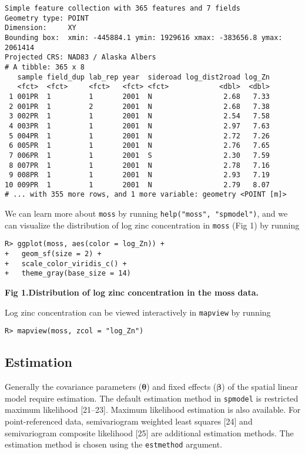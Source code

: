 \documentclass[10pt,letterpaper]{article}
\begin{document}
\begin{verbatim}
Simple feature collection with 365 features and 7 fields
Geometry type: POINT
Dimension:     XY
Bounding box:  xmin: -445884.1 ymin: 1929616 xmax: -383656.8 ymax: 2061414
Projected CRS: NAD83 / Alaska Albers
# A tibble: 365 x 8
   sample field_dup lab_rep year  sideroad log_dist2road log_Zn
   <fct>  <fct>     <fct>   <fct> <fct>            <dbl>  <dbl>
 1 001PR  1         1       2001  N                 2.68   7.33
 2 001PR  1         2       2001  N                 2.68   7.38
 3 002PR  1         1       2001  N                 2.54   7.58
 4 003PR  1         1       2001  N                 2.97   7.63
 5 004PR  1         1       2001  N                 2.72   7.26
 6 005PR  1         1       2001  N                 2.76   7.65
 7 006PR  1         1       2001  S                 2.30   7.59
 8 007PR  1         1       2001  N                 2.78   7.16
 9 008PR  1         1       2001  N                 2.93   7.19
10 009PR  1         1       2001  N                 2.79   8.07
# ... with 355 more rows, and 1 more variable: geometry <POINT [m]>
\end{verbatim}

We can learn more about \texttt{moss} by running
\texttt{help("moss",\ "spmodel")}, and we can visualize the distribution
of log zinc concentration in \texttt{moss} (Fig 1) by running

\begin{verbatim}
R> ggplot(moss, aes(color = log_Zn)) +
+   geom_sf(size = 2) +
+   scale_color_viridis_c() +
+   theme_gray(base_size = 14)
\end{verbatim}

\textbf{Fig 1.Distribution of log zinc concentration in the moss data.}

Log zinc concentration can be viewed interactively in \texttt{mapview}
by running

\begin{verbatim}
R> mapview(moss, zcol = "log_Zn")
\end{verbatim}

\hypertarget{estimation}{%
\subsection{Estimation}\label{estimation}}

Generally the covariance parameters (\(\boldsymbol{\theta}\)) and fixed
effects (\(\boldsymbol{\beta}\)) of the spatial linear model require
estimation. The default estimation method in \texttt{spmodel} is
restricted maximum likelihood {[}21--23{]}. Maximum likelihood
estimation is also available. For point-referenced data, semivariogram
weighted least squares {[}24{]} and semivariogram composite likelihood
{[}25{]} are additional estimation methods. The estimation method is
chosen using the \texttt{estmethod} argument.
\end{document}
